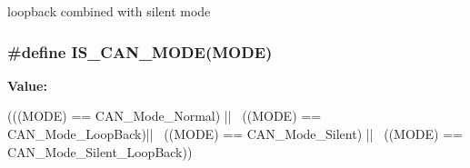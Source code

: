 loopback combined with silent mode \hypertarget{group__CAN__Mode_ga5d6480c240edeba383b4e07d65814d98}{
\subsubsection[{IS\_\-CAN\_\-MODE}]{\setlength{\rightskip}{0pt plus 5cm}\#define IS\_\-CAN\_\-MODE(MODE)}}
\label{group__CAN__Mode_ga5d6480c240edeba383b4e07d65814d98}
{\bfseries Value:}
\begin{DoxyCode}
(((MODE) == CAN_Mode_Normal) || \
                           ((MODE) == CAN_Mode_LoopBack)|| \
                           ((MODE) == CAN_Mode_Silent) || \
                           ((MODE) == CAN_Mode_Silent_LoopBack))
\end{DoxyCode}
